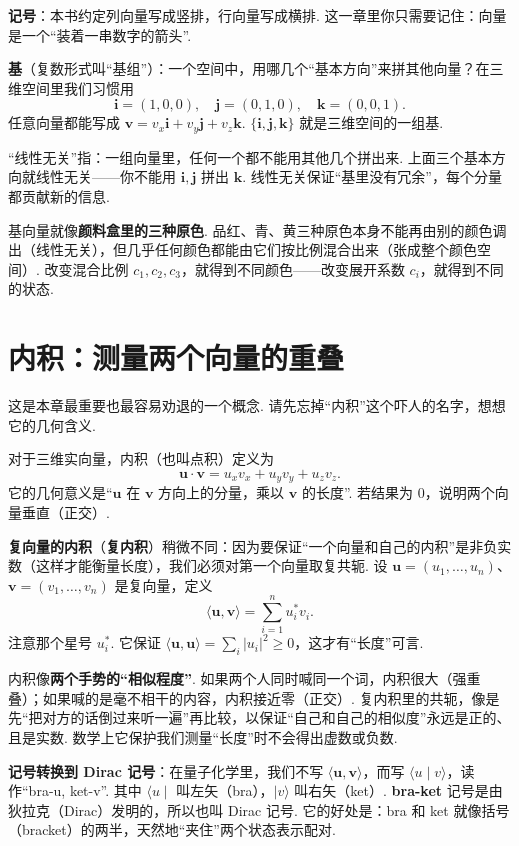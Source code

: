 \documentclass[UTF8,11pt,a4paper,openany]{ctexbook}
\newcommand{\term}[1]{\textbf{#1}}
\begin{document}
\textbf{记号}：本书约定列向量写成竖排，行向量写成横排. 这一章里你只需要记住：向量是一个“装着一串数字的箭头”. 

\term{基}（复数形式叫“基组”）：一个空间中，用哪几个“基本方向”来拼其他向量？在三维空间里我们习惯用
\[
\mathbf i=(1,0,0),\quad \mathbf j=(0,1,0),\quad \mathbf k=(0,0,1).
\]
任意向量都能写成 $\mathbf v=v_x\mathbf i+v_y\mathbf j+v_z\mathbf k$. $\{\mathbf i,\mathbf j,\mathbf k\}$ 就是三维空间的一组基. 

“线性无关”指：一组向量里，任何一个都不能用其他几个拼出来. 上面三个基本方向就线性无关——你不能用 $\mathbf i,\mathbf j$ 拼出 $\mathbf k$. 线性无关保证“基里没有冗余”，每个分量都贡献新的信息. 

\begin{analogybox}
基向量就像\textbf{颜料盒里的三种原色}. 品红、青、黄三种原色本身不能再由别的颜色调出（线性无关），但几乎任何颜色都能由它们按比例混合出来（张成整个颜色空间）. 改变混合比例 $c_1,c_2,c_3$，就得到不同颜色——改变展开系数 $c_i$，就得到不同的状态. 
\end{analogybox}

\section{内积：测量两个向量的重叠}
\label{sec:inner-product}
这是本章最重要也最容易劝退的一个概念. 请先忘掉“内积”这个吓人的名字，想想它的几何含义. 

对于三维实向量，内积（也叫点积）定义为
\[
\mathbf u\cdot\mathbf v=u_xv_x+u_yv_y+u_zv_z.
\]
它的几何意义是“$\mathbf u$ 在 $\mathbf v$ 方向上的分量，乘以 $\mathbf v$ 的长度”. 若结果为 $0$，说明两个向量垂直（正交）. 

\textbf{复向量的内积}（\term{复内积}）稍微不同：因为要保证“一个向量和自己的内积”是非负实数（这样才能衡量长度），我们必须对第一个向量取复共轭. 设 $\mathbf u=(u_1,\ldots,u_n)$、$\mathbf v=(v_1,\ldots,v_n)$ 是复向量，定义
\[
\langle\mathbf u,\mathbf v\rangle=\sum_{i=1}^n u_i^*v_i.
\]
注意那个星号 $u_i^*$. 它保证 $\langle\mathbf u,\mathbf u\rangle=\sum_i|u_i|^2\ge0$，这才有“长度”可言. 

\begin{analogybox}
内积像\textbf{两个手势的“相似程度”}. 如果两个人同时喊同一个词，内积很大（强重叠）；如果喊的是毫不相干的内容，内积接近零（正交）. 复内积里的共轭，像是先“把对方的话倒过来听一遍”再比较，以保证“自己和自己的相似度”永远是正的、且是实数. 数学上它保护我们测量“长度”时不会得出虚数或负数. 
\end{analogybox}

\textbf{记号转换到 Dirac 记号}：在量子化学里，我们不写 $\langle\mathbf u,\mathbf v\rangle$，而写 $\langle u\mid v\rangle$，读作“bra-u, ket-v”. 其中 $\langle u\mid$ 叫左矢（bra），$\mid v\rangle$ 叫右矢（ket）. \term{bra-ket} 记号是由狄拉克（Dirac）发明的，所以也叫 Dirac 记号. 它的好处是：bra 和 ket 就像括号（bracket）的两半，天然地“夹住”两个状态表示配对. 
\end{document}
